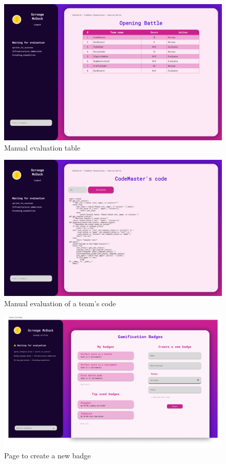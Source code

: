 \begin{figure}[H]
    \centering
    \includegraphics[width=.9\textwidth]{images/user_interfaces/manual_evaluation.png}
    \caption{Manual evaluation table}
\end{figure}
\begin{figure}[H]
    \centering
    \includegraphics[width=.9\textwidth]{images/user_interfaces/code_manual.png}
    \caption{Manual evaluation of a team's code}
\end{figure}
\begin{figure}[H]
    \centering
    \includegraphics[width=.9\textwidth]{images/user_interfaces/new_badge.png}
    \caption{Page to create a new badge}
\end{figure}

